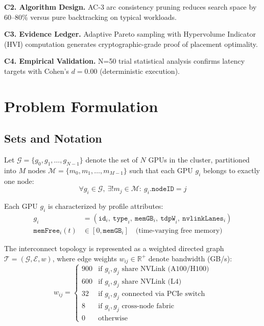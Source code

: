 \documentclass[11pt, twoside]{article}
\begin{document}
\noindent\textbf{C2. Algorithm Design.} AC-3 arc consistency pruning reduces search space by 60--80\% versus pure backtracking on typical workloads.

\noindent\textbf{C3. Evidence Ledger.} Adaptive Pareto sampling with Hypervolume Indicator (HVI) computation generates cryptographic-grade proof of placement optimality.

\noindent\textbf{C4. Empirical Validation.} N=50 trial statistical analysis confirms latency targets with Cohen's $d=0.00$ (deterministic execution).

\section{Problem Formulation}

\subsection{Sets and Notation}

Let $\mathcal{G} = \{g_0, g_1, \ldots, g_{N-1}\}$ denote the set of $N$ GPUs in the cluster, partitioned into $M$ nodes $\mathcal{M} = \{m_0, m_1, \ldots, m_{M-1}\}$ such that each GPU $g_i$ belongs to exactly one node:
\begin{equation}
\forall g_i \in \mathcal{G},\ \exists! m_j \in \mathcal{M}:\ g_i.\texttt{nodeID} = j
\label{eq:node_membership}
\end{equation}

Each GPU $g_i$ is characterized by profile attributes:
\begin{align}
g_i &= (\texttt{id}_i,\ \texttt{type}_i,\ \texttt{memGB}_i,\ \texttt{tdpW}_i,\ \texttt{nvlinkLanes}_i) \\
\texttt{memFree}_{i}(t) &\in [0, \texttt{memGB}_i] \quad \text{(time-varying free memory)}
\end{align}

The interconnect topology is represented as a weighted directed graph $\mathcal{T} = (\mathcal{G}, \mathcal{E}, w)$, where edge weights $w_{ij} \in \mathbb{R}^+$ denote bandwidth (GB/s):
\begin{equation}
w_{ij} = \begin{cases}
900 & \text{if } g_i,g_j \text{ share NVLink (A100/H100)} \\
600 & \text{if } g_i,g_j \text{ share NVLink (L4)} \\
32 & \text{if } g_i,g_j \text{ connected via PCIe switch} \\
8 & \text{if } g_i,g_j \text{ cross-node fabric} \\
0 & \text{otherwise}
\end{cases}
\label{eq:bandwidth_matrix}
\end{equation}
\end{document}
